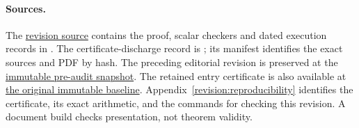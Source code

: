 \paragraph{Sources.}
The \href{https://github.com/kolodziejek/berry-esseen-certificates/tree/manuscript/revision-v16-20261029/manuscript/compact-v16}{revision source}
contains the proof, scalar checkers and dated execution records
in . The certificate-discharge record is
; its manifest identifies
the exact sources and PDF by hash. The preceding editorial revision
is preserved at the
\href{https://github.com/kolodziejek/berry-esseen-certificates/tree/77d7b4b2510a6ce5b2d8e162bd2a78ecbecec1b5/manuscript/compact-v16}{immutable pre-audit snapshot}.
The retained entry certificate is also available at
\href{https://github.com/kolodziejek/berry-esseen-certificates/tree/cd10654222f4b63d50f9d8f108597b140d263ec5}{the original immutable baseline}.
Appendix~\ref{revision:reproducibility} identifies the certificate, its
exact arithmetic, and the commands for checking this revision.
A document build checks presentation, not theorem validity.
